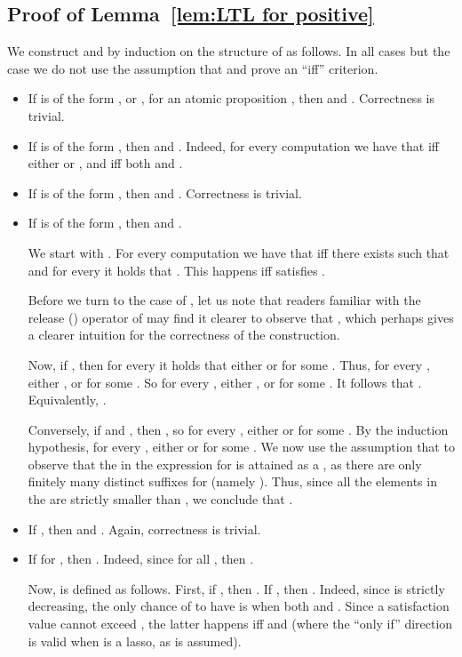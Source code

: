 \documentclass{llncs}
\begin{document}
\subsection{Proof of Lemma~\ref{lem:LTL for positive}}

We construct  and  by induction on the structure of  as follows. In all cases but the  case we do not use the assumption that  and prove an ``iff'' criterion. 
\begin{itemize}
\item If  is of the form , or , for an atomic proposition , then  and . Correctness is trivial.

\item If  is of the form , then   and . Indeed, for every computation  we have that  iff either  or , and   iff both  and .

\item If  is of the form , then  and . Correctness is trivial.


\item If  is of the form , then  and . 

We start with . For every computation  we have that  iff there exists  such that  and for every  it holds that . This happens iff  satisfies . 

Before we turn to the case of , let us note that
readers familiar with the release () operator of  may find it clearer to observe that , which perhaps gives a clearer intuition for the correctness of the construction.

Now, if , then for every  it holds that either  or  for some . Thus, for every , either , or  for some . So for every , either , or  for some . It follows that . Equivalently, .

Conversely, if  and , then , so for every , either  or  for some . By the induction hypothesis, for every , either  or  for some . We now use the assumption that  to observe that the  in the expression for  is attained as a , as there are only finitely many distinct suffixes for  (namely ). Thus, since all the elements in the  are strictly smaller than , we conclude that .


\item  If , then  and . Again, correctness is trivial.

\item
If  for , then
. Indeed, since  for all , then 
.

Now,  is defined as follows. First, if , then . If , then . Indeed, since  is strictly decreasing, the only chance of  to have  is when both  and . Since a satisfaction value cannot exceed , the latter happens iff  and  (where the ``only if'' direction is valid when  is a lasso, as is assumed). 

\end{itemize}
\end{document}
